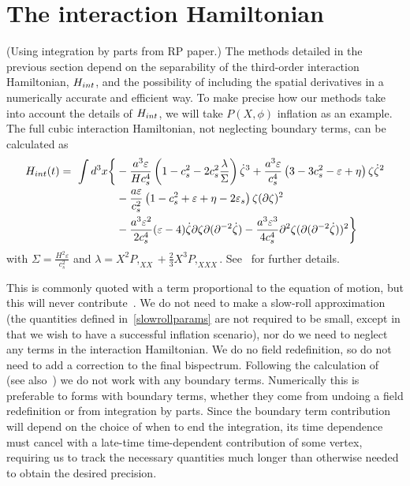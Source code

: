 \section{The interaction Hamiltonian}\label{sec:h_int}
    (Using integration by parts from RP paper.)
The methods detailed in the previous section depend on the separability of
the third-order interaction Hamiltonian, $H_{int}$,
and the possibility of including the spatial derivatives in a
numerically accurate and efficient way.
To make precise how our methods take into account the details of
$H_{int}$, we will take $P(X,\phi)$ inflation as an example.
The full cubic interaction Hamiltonian, not neglecting boundary terms,
can be calculated as~\cite{px_burrage,chen_ng_0605,seery_ng_0503}
\begin{align}
    H_{int}(t)=\ \int d^3x\bigg\{& -\frac{a^3\varepsilon}{H c_s^4}\left(1-c_s^{2}-2c_s^{2}\frac{\lambda}{\Sigma}\right)\dot{\zeta}^3
		+ \frac{a^3\varepsilon}{c_s^{4}}\left(3-3c_s^2-\varepsilon+\eta\right) \zeta\dot{\zeta}^2\nonumber\\
		&- \frac{a\varepsilon}{c_s^{2}}\left(1-c_s^2+\varepsilon+\eta-2\varepsilon_s\right) \zeta(\partial\zeta)^2\nonumber\\
        &- \frac{a^3\varepsilon^2}{2c_s^{4}}(\varepsilon-4)\dot{\zeta}\partial\zeta\partial(\partial^{-2}\dot{\zeta})
        - \frac{a^3\varepsilon^3}{4c_s^4}\partial^2\zeta(\partial(\partial^{-2}\dot{\zeta}))^2\bigg\}\label{interaction_loc}
\end{align}
with $\Sigma=\frac{H^2\varepsilon}{c^2_s}$
and $\lambda = X^2P,_{XX}+\frac{2}{3}X^3P,_{XXX}$.
See~\cite{px_burrage} for further details.


This is commonly quoted with a term proportional to the equation of motion,
but this will never contribute~\cite{px_burrage,bdy_arroja,bdy_passaglia,bdy_rigopoulos}.
We do not need to make a slow-roll approximation
(the quantities defined in~\eqref{slowrollparams} are not required to be small,
except in that we wish to have a successful inflation scenario),
nor do we need to neglect any terms in the interaction Hamiltonian.
We do no field redefinition,
so do not need to add a correction to the final bispectrum.
Following the calculation of~\cite{px_burrage} (see also~\cite{bdy_arroja,bdy_passaglia,bdy_rigopoulos})
we do not work with any boundary terms.
Numerically this is preferable to forms with boundary terms,
whether they come from undoing a field redefinition or from integration by parts.
Since the boundary term contribution will depend on the choice of when to end the integration,
its time dependence must cancel with a late-time time-dependent
contribution of some vertex, requiring us to track the necessary quantities
much longer than otherwise needed to obtain the desired precision.

